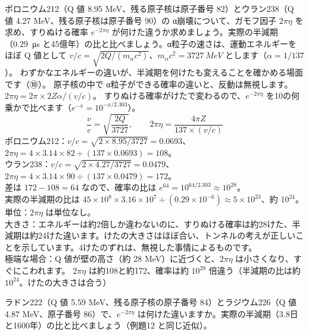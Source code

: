 \label{ph:原-12:ex12}
\begin{phreidai}[ガモフ因子と半減期のけた]
ポロニウム212（Q 値 8.95 MeV、残る原子核は原子番号 82）とウラン238（Q 値 4.27 MeV、残る原子核は原子番号 90）の α崩壊について、ガモフ因子 $2\pi\eta$ を求め、すりぬける確率 $e^{-2\pi\eta}$ が何けた違うか求めましょう。実際の半減期（\qty{0.29}{\micro s} と45億年）の比と比べましょう。α粒子の速さは、運動エネルギーをほぼ Q 値として $v/c=\sqrt{2Q/(m_\alpha c^2)}$、$m_\alpha c^2=\qty{3727}{MeV}$ とします（$\alpha=1/137$）。
\phbamen
わずかなエネルギーの違いが、半減期を何けたも変えることを確かめる場面です（⑩）。
\phmushi
原子核の中で α粒子ができる確率の違いと、反動は無視します。
\phzu
$2\pi\eta=2\pi\times2Z\alpha/(v/c)$。
\phriyu
すりぬける確率がけたで変わるので、$e^{-2\pi\eta}$ を10の何乗かで比べます（$e^{-x}=10^{-x/2.303}$）。
\phtateru
\[ \frac{v}{c}=\sqrt{\frac{2Q}{3727}},\qquad2\pi\eta=\frac{4\pi Z}{137\times(v/c)} \]
\phtoku
ポロニウム212：$v/c=\sqrt{2\times8.95/3727}=0.0693$、$2\pi\eta=4\times3.14\times82\div(137\times0.0693)=108$。\\
ウラン238：$v/c=\sqrt{2\times4.27/3727}=0.0479$、$2\pi\eta=4\times3.14\times90\div(137\times0.0479)=172$。\\
差は $172-108=64$ なので、確率の比は $e^{64}=10^{64/2.303}\approx10^{28}$。\\
実際の半減期の比は $45\times10^8\times3.16\times10^7\div(0.29\times10^{-6})\approx5\times10^{23}$、約 $10^{24}$。
\phtashikame
単位：$2\pi\eta$ は単位なし。\\
大きさ：エネルギーは約2倍しか違わないのに、すりぬける確率は約28けた、半減期は約24けた違います。けたの大きさはほぼ合い、トンネルの考えが正しいことを示しています。4けたのずれは、無視した事情によるものです。\\
極端な場合：Q 値が壁の高さ（約 28 MeV）に近づくと、$2\pi\eta$ は小さくなり、すぐにこわれます。
\kotae $2\pi\eta$ は約108と約172、確率は約 $10^{28}$ 倍違う（半減期の比は約 $10^{24}$。けたの大きさは合う）
\end{phreidai}
\begin{jibun}
ラドン222（Q 値 5.59 MeV、残る原子核の原子番号 84）とラジウム226（Q 値 4.87 MeV、原子番号 86）で、$e^{-2\pi\eta}$ は何けた違いますか。実際の半減期（3.8日と1600年）の比と比べましょう（例題12 と同じ近似）。
\end{jibun}

